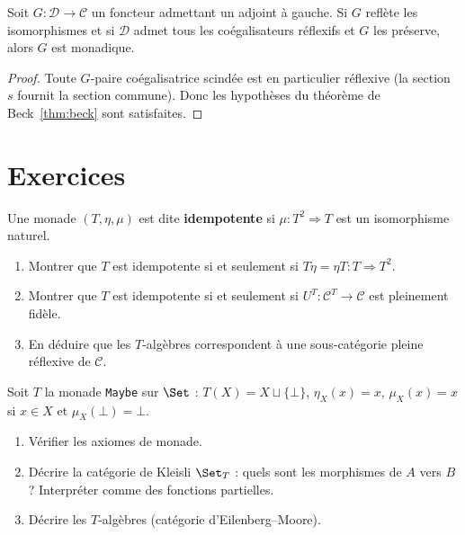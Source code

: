 \begin{theoreme}%
\label{thm:beck-simplifie}
Soit $G \colon \mathcal{D} \to \mathcal{C}$ un foncteur admettant un
adjoint à gauche. Si $G$ reflète les isomorphismes et si $\mathcal{D}$
admet tous les coégalisateurs réflexifs
et $G$ les préserve, alors $G$ est monadique.
\end{theoreme}

\begin{proof}
Toute $G$-paire coégalisatrice scindée est en particulier réflexive
(la section $s$ fournit la section commune). Donc les hypothèses du
théorème de Beck~\ref{thm:beck} sont satisfaites.
\end{proof}


\section{Exercices}\label{sec:exo-monades}

\begin{exercice}\label{exo:monade-idempotente}
Une monade $(T, \eta, \mu)$ est dite \textbf{idempotente} si
$\mu \colon T^2 \Rightarrow T$ est un isomorphisme naturel.
\begin{enumerate}[label=(\alph*)]
\item Montrer que $T$ est idempotente si et seulement si
    $T\eta = \eta T \colon T \Rightarrow T^2$.
\item Montrer que $T$ est idempotente si et seulement si
    $U^T \colon \mathcal{C}^T \to \mathcal{C}$ est pleinement fidèle.
\item En déduire que les $T$-algèbres correspondent à une
    sous-catégorie pleine réflexive de $\mathcal{C}$.
\end{enumerate}
\end{exercice}

\begin{exercice}\label{exo:kleisli-informatique}
Soit $T$ la monade \texttt{Maybe} sur $\Set$ :
$T(X) = X \sqcup \{\bot\}$, $\eta_X(x) = x$,
$\mu_X(x) = x$ si $x \in X$ et $\mu_X(\bot) = \bot$.
\begin{enumerate}[label=(\alph*)]
\item Vérifier les axiomes de monade.
\item Décrire la catégorie de Kleisli $\Set_T$ : quels sont les morphismes
    de $A$ vers $B$ ? Interpréter comme des fonctions partielles.
\item Décrire les $T$-algèbres (catégorie d'Eilenberg--Moore).
\end{enumerate}
\end{exercice}

